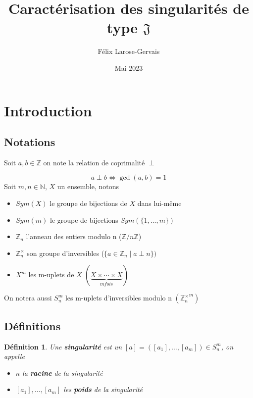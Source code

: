 \documentclass{article}
\title{Caractérisation des singularités de type $\mathfrak{J}$}
\author{Félix Larose-Gervais}
\date{Mai 2023}
\newtheorem{definition}{Définition}
\begin{document}
\maketitle

\newpage

\tableofcontents

\newpage

\section{Introduction}

\subsection{Notations}

Soit $a, b \in \mathbb{Z}$ on note la relation de coprimalité $\perp$

\[ a \perp b \iff \gcd(a, b) = 1 \]
Soit $m, n \in \mathbb{N}$, $X$ un ensemble, notons 

\begin{itemize}
    \item $Sym(X)$ le groupe de bijections de $X$ dans lui-même
    \item $Sym(m)$ le groupe de bijections $Sym(\{1, \dots, m \})$ 
    \item $\mathbb{Z}_n$ l'anneau des entiers modulo n ($\mathbb{Z}/n\mathbb{Z}$)
    \item $\mathbb{Z}_n^\times$ son groupe d'inversibles ($\{ a \in \mathbb{Z}_n \mid a \perp n \})$
    \item $X^m$ les m-uplets de $X$ $(\underbrace{X \times \cdots \times X}_{m fois})$
\end{itemize}
On notera aussi $S_n^m$ les m-uplets d'inversibles modulo n $({\mathbb{Z}_n^\times}^m)$

\subsection{Définitions}

\begin{definition}
    Une \textbf{singularité} est un $[a] = ([a_1], \dots, [a_m]) \in S_n^m$, on appelle \begin{itemize}
        \item $n$ la \textbf{racine} de la singularité
        \item $[a_1], \dots, [a_m]$ les \textbf{poids} de la singularité
    \end{itemize}
\end{definition}
\end{document}
